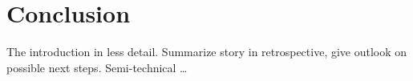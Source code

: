 \section{Conclusion} \label{conclusion}

The introduction in less detail. Summarize story in retrospective, give outlook on possible next steps. Semi-technical \ldots
